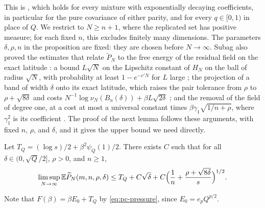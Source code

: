 This is \cite[Proposition~24, (3.1)]{Subag2024}, which holds for every mixture with exponentially decaying coefficients, in particular for the pure covariance of either parity, and for every $q\in[0,1)$ in place of $Q$. We restrict to $N\ge n+1$, where the replicated set has positive measure; for each fixed $n$, this excludes finitely many dimensions. The parameters $\delta,\rho,n$ in the proposition are fixed: they are chosen before $N\to\infty$. Subag also proved the estimates that relate $\widetilde P_N$ to the free energy of the residual field on the exact latitude \cite[Lemmas~17--19]{Subag2024}: a bound $L\sqrt N$ on the Lipschitz constant of $H_N$ on the ball of radius $\sqrt N$, with probability at least $1-e^{-c'N}$ for $L$ large \cite[Lemma~17]{Subag2024}; the projection of a band of width $\delta$ onto its exact latitude, which raises the pair tolerance from $\rho$ to $\rho+\sqrt{8\delta}$ and costs $N^{-1}\log\nu_N(B_u(\delta))+\beta L\sqrt{2\delta}$ \cite[Lemma~18, (2.2)]{Subag2024}; and the removal of the field of degree one, at a cost at most a universal constant times $\beta\gamma_1\sqrt{1/n+\rho}$, where $\gamma_1^2$ is its coefficient \cite[Lemma~19, (2.5)]{Subag2024}. The proof of the next lemma follows these arguments, with fixed $n$, $\rho$, and $\delta$, and it gives the upper bound we need directly.

\begin{lemma}\label{lem:pc-replica-mean}
Let $T_Q=(\log s)/2+\beta^2\psi_Q(1)/2$. There exists $C$ such that for all $\delta\in(0,\sqrt Q/2]$, $\rho>0$, and $n\ge1$,
\begin{equation}\label{eq:pc-replica-mean}
\limsup_{N\to\infty}\mathbb E\widetilde P_N(m,n,\rho,\delta)\le T_Q+C\sqrt\delta+C\Bigl(\frac1n+\frac{\rho+\sqrt{8\delta}}s\Bigr)^{1/2}.
\end{equation}
\end{lemma}

Note that $F(\beta)=\beta E_0+T_Q$ by \eqref{eq:pc-pressure}, since $E_0=e_pQ^{p/2}$.

